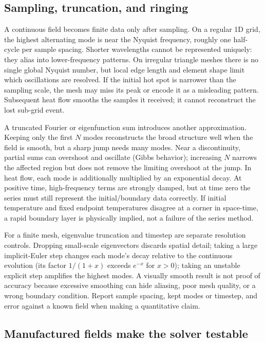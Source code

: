 \subsection{Sampling, truncation, and ringing}\label{02-foundations-ii-ch025-sampling-truncation-and-ringing}

A continuous field becomes finite data only after sampling. On a regular 1D grid, the highest alternating mode is near the Nyquist frequency, roughly one half-cycle per sample spacing. Shorter wavelengths cannot be represented uniquely: they alias into lower-frequency patterns. On irregular triangle meshes there is no single global Nyquist number, but local edge length and element shape limit which oscillations are resolved. If the initial hot spot is narrower than the sampling scale, the mesh may miss its peak or encode it as a misleading pattern. Subsequent heat flow smooths the samples it received; it cannot reconstruct the lost sub-grid event.

A truncated Fourier or eigenfunction sum introduces another approximation. Keeping only the first \(N\) modes reconstructs the broad structure well when the field is smooth, but a sharp jump needs many modes. Near a discontinuity, partial sums can overshoot and oscillate (Gibbs behavior); increasing \(N\) narrows the affected region but does not remove the limiting overshoot at the jump. In heat flow, each mode is additionally multiplied by an exponential decay. At positive time, high-frequency terms are strongly damped, but at time zero the series must still represent the initial/boundary data correctly. If initial temperature and fixed endpoint temperatures disagree at a corner in space-time, a rapid boundary layer is physically implied, not a failure of the series method.

For a finite mesh, eigenvalue truncation and timestep are separate resolution controls. Dropping small-scale eigenvectors discards spatial detail; taking a large implicit-Euler step changes each mode's decay relative to the continuous evolution (its factor \(1/(1+x)\) exceeds \(e^{-x}\) for \(x>0\)); taking an unstable explicit step amplifies the highest modes. A visually smooth result is not proof of accuracy because excessive smoothing can hide aliasing, poor mesh quality, or a wrong boundary condition. Report sample spacing, kept modes or timestep, and error against a known field when making a quantitative claim.

\subsection{Manufactured fields make the solver testable}\label{02-foundations-ii-ch025-manufactured-fields-make-the-solver-testable}

